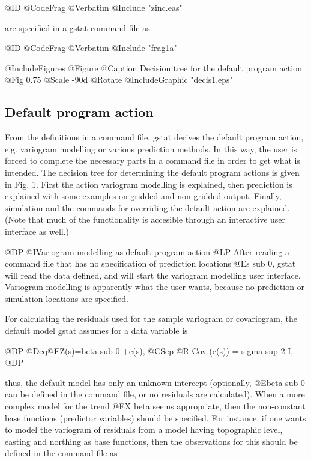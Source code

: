 \documentclass{article}
\begin{document}
@ID @CodeFrag{ @Verbatim { @Include { "zinc.eas" }}}

are specified in a gstat command file as

@ID @CodeFrag { @Verbatim { @Include { "frag1a" }}}

@IncludeFigures {
@Figure
 @Caption { Decision tree for the default program action }
{ @Fig { 0.75 @Scale -90d @Rotate @IncludeGraphic "decis1.eps" } }
}

\subsection{Default program action}
From the definitions in a command file, gstat derives the default program
action, e.g. variogram modelling or various prediction methods. In this
way, the user is forced to complete the necessary parts in a command file
in order to get what is intended. The decision tree for determining the
default program actions is given in Fig. 1. First the action variogram
modelling is explained, then prediction is explained with some examples
on gridded and non-gridded output. Finally, simulation and the commands
for overriding the default action are explained. (Note that much of the
functionality is accesible through an interactive user interface as
well.)

@DP
@I{Variogram modelling as default program action}
@LP
After reading a command file that has no specification of prediction
locations @E{s sub 0}, gstat will read the data defined, and will start
the variogram modelling user interface. Variogram modelling is apparently
what the user wants, because no prediction or simulation locations are
specified.

For calculating the residuals used for the sample variogram or
covariogram, the default model gstat assumes for a data variable is

@DP
@Deq{@E{Z(s)=beta sub 0 +e(s), @CSep @R Cov (e(s)) = sigma sup 2 I},}
@DP

thus, the default model has only an unknown intercept (optionally,
@E{beta sub 0} can be defined in the command file, or no residuals are
calculated).  When a more complex model for the trend @E{X beta} seems
appropriate, then the non-constant base functions (predictor variables)
should be specified.  For instance, if one wants to model the variogram
of residuals from a model having topographic level, easting and northing
as base functions, then the observations for this should be defined in
the command file as
\end{document}
